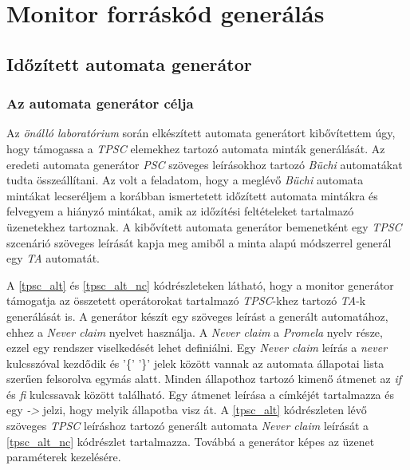 \chapter{Monitor forráskód generálás}\section{Időzített automata generátor}

\subsection{Az automata generátor célja}

Az \textit{önálló laboratórium} során elkészített automata generátort kibővítettem úgy, hogy támogassa a \textit{TPSC} elemekhez tartozó automata minták generálását.
Az eredeti automata generátor \textit{PSC} szöveges leírásokhoz tartozó \textit{Büchi} automatákat tudta összeállítani.
Az volt a feladatom, hogy a meglévő \textit{Büchi} automata mintákat lecseréljem a korábban ismertetett időzített automata mintákra és felvegyem a hiányzó mintákat, amik az időzítési feltételeket tartalmazó üzenetekhez tartoznak.
A kibővített automata generátor bemenetként egy \textit{TPSC} szcenárió szöveges leírását kapja meg amiből a minta alapú módszerrel generál egy \textit{TA} automatát.

A \ref{tpsc_alt} és \ref{tpsc_alt_nc} kódrészleteken látható, hogy a monitor generátor támogatja az összetett operátorokat tartalmazó \textit{TPSC}-khez tartozó \textit{TA}-k generálását is.
A generátor készít egy szöveges leírást a generált automatához, ehhez a \textit{Never claim} nyelvet használja.
A \textit{Never claim} a \textit{Promela} nyelv része, ezzel egy rendszer viselkedését lehet definiálni.
Egy \textit{Never claim} leírás a \textit{never} kulcsszóval kezdődik és '\{' '\}' jelek között vannak az automata állapotai lista szerűen felsorolva egymás alatt.
Minden állapothoz tartozó kimenő átmenet az \textit{if} és \textit{fi} kulcssavak között található.
Egy átmenet leírása a címkéjét tartalmazza és egy \textit{->} jelzi, hogy melyik állapotba visz át.
A \ref{tpsc_alt} kódrészleten lévő szöveges \textit{TPSC} leíráshoz tartozó generált automata \textit{Never claim} leírását a \ref{tpsc_alt_nc} kódrészlet tartalmazza.
Továbbá a generátor képes az üzenet paraméterek kezelésére.


